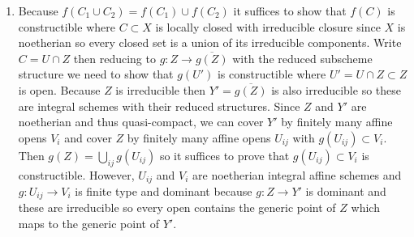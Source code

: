 \documentclass[12pt]{article}
\begin{document}
\begin{enumerate}
\item Because $f(C_1 \cup C_2) = f(C_1) \cup f(C_2)$ it suffices to show that $f(C)$ is constructible where $C \subset X$ is locally closed with irreducible closure since $X$ is noetherian so every closed set is a union of its irreducible components. Write $C = U \cap Z$ then reducing to $g : Z \to \overline{g(Z)}$ with the reduced subscheme structure we need to show that $g(U')$ is constructible where $U' = U \cap Z \subset Z$ is open. Because $Z$ is irreducible then $Y' = \overline{g(Z)}$ is also irreducible so these are integral schemes with their reduced structures. Since $Z$ and $Y'$ are noetherian and thus quasi-compact, we can cover $Y'$ by finitely many affine opens $V_i$ and cover $Z$ by finitely many affine opens $U_{ij}$ with $g(U_{ij}) \subset V_i$. Then $g(Z) = \bigcup_{ij} g(U_{ij})$ so it suffices to prove that $g(U_{ij}) \subset V_i$ is constructible. However, $U_{ij}$ and $V_i$ are noetherian integral affine schemes and $g : U_{ij} \to V_i$ is finite type and dominant because $g : Z \to Y'$ is dominant and these are irreducible so every open contains the generic point of $Z$ which maps to the generic point of $Y'$. 


\end{enumerate}
\end{document}
